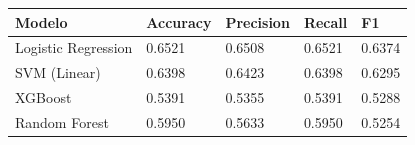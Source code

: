 \begin{tabular}{lllll}
\toprule
Modelo & Accuracy & Precision & Recall & F1 \\
\midrule
Logistic Regression & 0.6521 & 0.6508 & 0.6521 & 0.6374 \\
SVM (Linear) & 0.6398 & 0.6423 & 0.6398 & 0.6295 \\
XGBoost & 0.5391 & 0.5355 & 0.5391 & 0.5288 \\
Random Forest & 0.5950 & 0.5633 & 0.5950 & 0.5254 \\
\bottomrule
\end{tabular}
